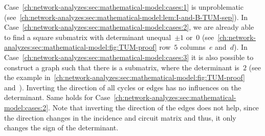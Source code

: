 Case~\ref{ch:network-analyzes:sec:mathematical-model:cases:1} is unproblematic
(see~\cref{ch:network-analyzes:sec:mathematical-model:lem:I-and-B-TUM-sep}). In
Case~\ref{ch:network-analyzes:sec:mathematical-model:cases:2}, we are already
able to find a square submatrix with determinant unequal~$\pm 1$ or~$0$
(see~\cref{ch:network-analyzes:sec:mathematical-model:fig:TUM-proof}
row~$5$ columns~$e$ and~$d$). 
% 
% 
% 
In Case~\ref{ch:network-analyzes:sec:mathematical-model:cases:3} it is also
possible to construct a graph such that there is a submatrix, where the
determinant is~$2$ (see the example
in~\cref{ch:network-analyzes:sec:mathematical-model:fig:TUM-proof}
and~). Inverting the direction of all cycles or edges has no influences
on the determinant. Same holds for
Case~\ref{ch:network-analyzes:sec:mathematical-model:cases:2}. Note that
inverting the direction of the edges does not help, since the direction changes
in the incidence and circuit matrix and thus, it only changes the sign of the
determinant.

